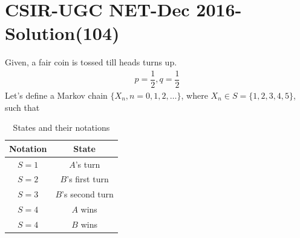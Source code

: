 \documentclass[journal,12pt,twocolumn]{IEEEtran}
\begin{document}
\section*{CSIR-UGC NET-Dec 2016-Solution(104)}
Given, a fair coin is tossed till heads turns up.
\begin{align}
\tag{104.1}
\label{eq:0}
    p=\dfrac{1}{2},q=\dfrac{1}{2}
\end{align}
Let's define a Markov chain $\{X_{n},n=0,1,2,\dots\}$, where $X_{n}\in S=\{1,2,3,4,5\}$, such that
\begin{table}[h!]
\centering
\caption{States and their notations}
\label{table:1}
\begin{tabular}{|c|c|}
    \hline
    Notation & State \\
    \hline
    $S=1$ & $A$'s turn\\[1ex]
    \hline
    $S=2$ & $B$'s first turn\\[1ex]
    \hline
    $S=3$ & $B$'s second turn\\[1ex]
    \hline
    $S=4$ & $A$ wins\\[1ex]
    \hline
    $S=4$ & $B$ wins\\[1ex]
    \hline
\end{tabular}
\end{table}
\end{document}
